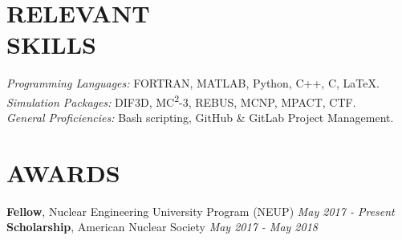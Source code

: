 \documentclass[margin, 10pt]{res} %
\begin{document}
\begin{resume}

\section{RELEVANT \\ SKILLS}

{\sl Programming Languages:} FORTRAN, MATLAB, Python, C++, C, \LaTeX. \\
{\sl Simulation Packages:} DIF3D, MC\textsuperscript{2}-3, REBUS, MCNP, MPACT, CTF. \\
{\sl General Proficiencies:} Bash scripting, GitHub \& GitLab Project Management.

\section{AWARDS}
\textbf{Fellow}, Nuclear Engineering University Program (NEUP) \hfill \textit{May 2017 - Present} \\
\textbf{Scholarship}, American Nuclear Society \hfill \textit{May 2017 - May 2018}

\end{resume}
\end{document}
